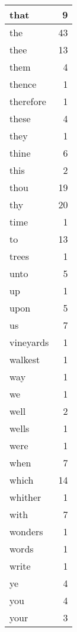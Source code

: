 \begin{center}
\begin{longtable}{l|r}
that & 9 \\ \hline
the & 43 \\ \hline
thee & 13 \\ \hline
them & 4 \\ \hline
thence & 1 \\ \hline
therefore & 1 \\ \hline
these & 4 \\ \hline
they & 1 \\ \hline
thine & 6 \\ \hline
this & 2 \\ \hline
thou & 19 \\ \hline
thy & 20 \\ \hline
time & 1 \\ \hline
to & 13 \\ \hline
trees & 1 \\ \hline
unto & 5 \\ \hline
up & 1 \\ \hline
upon & 5 \\ \hline
us & 7 \\ \hline
vineyards & 1 \\ \hline
walkest & 1 \\ \hline
way & 1 \\ \hline
we & 1 \\ \hline
well & 2 \\ \hline
wells & 1 \\ \hline
were & 1 \\ \hline
when & 7 \\ \hline
which & 14 \\ \hline
whither & 1 \\ \hline
with & 7 \\ \hline
wonders & 1 \\ \hline
words & 1 \\ \hline
write & 1 \\ \hline
ye & 4 \\ \hline
you & 4 \\ \hline
your & 3 \\ \hline
\end{longtable}
\end{center}



\normalsize



